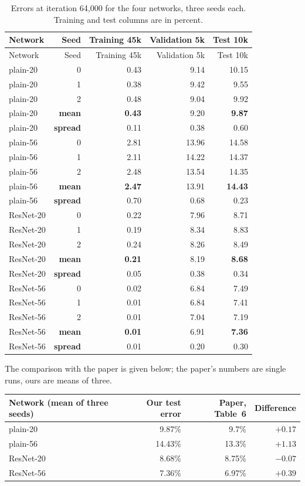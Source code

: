 \documentclass[11pt,a4paper]{article}
\begin{document}
\begin{longtable}{@{}lrrrr@{}}
\caption{Errors at iteration 64{,}000 for the four networks, three seeds each.
Training and test columns are in percent.}\label{tab:core}\\
\toprule
Network & Seed & Training 45k & Validation 5k & Test 10k \\
\midrule
\endfirsthead
\toprule
Network & Seed & Training 45k & Validation 5k & Test 10k \\
\midrule
\endhead
\bottomrule
\endfoot
plain-20 & 0 & 0.43 & 9.14 & 10.15 \\
plain-20 & 1 & 0.38 & 9.42 & 9.55 \\
plain-20 & 2 & 0.48 & 9.04 & 9.92 \\
plain-20 & \textbf{mean} & \textbf{0.43} & 9.20 & \textbf{9.87} \\
plain-20 & \textbf{spread} & 0.11 & 0.38 & 0.60 \\
\midrule
plain-56 & 0 & 2.81 & 13.96 & 14.58 \\
plain-56 & 1 & 2.11 & 14.22 & 14.37 \\
plain-56 & 2 & 2.48 & 13.54 & 14.35 \\
plain-56 & \textbf{mean} & \textbf{2.47} & 13.91 & \textbf{14.43} \\
plain-56 & \textbf{spread} & 0.70 & 0.68 & 0.23 \\
\midrule
ResNet-20 & 0 & 0.22 & 7.96 & 8.71 \\
ResNet-20 & 1 & 0.19 & 8.34 & 8.83 \\
ResNet-20 & 2 & 0.24 & 8.26 & 8.49 \\
ResNet-20 & \textbf{mean} & \textbf{0.21} & 8.19 & \textbf{8.68} \\
ResNet-20 & \textbf{spread} & 0.05 & 0.38 & 0.34 \\
\midrule
ResNet-56 & 0 & 0.02 & 6.84 & 7.49 \\
ResNet-56 & 1 & 0.01 & 6.84 & 7.41 \\
ResNet-56 & 2 & 0.01 & 7.04 & 7.19 \\
ResNet-56 & \textbf{mean} & \textbf{0.01} & 6.91 & \textbf{7.36} \\
ResNet-56 & \textbf{spread} & 0.01 & 0.20 & 0.30 \\
\end{longtable}

The comparison with the paper is given below; the paper's numbers are single
runs, ours are means of three.

\begin{center}
\begin{tabular}{@{}lrrr@{}}
\toprule
Network (mean of three seeds) & Our test error & Paper, Table~6 & Difference \\
\midrule
plain-20 & 9.87\% & 9.7\% & $+0.17$ \\
plain-56 & 14.43\% & 13.3\% & $+1.13$ \\
ResNet-20 & 8.68\% & 8.75\% & $-0.07$ \\
ResNet-56 & 7.36\% & 6.97\% & $+0.39$ \\
\bottomrule
\end{tabular}
\end{center}
\end{document}

